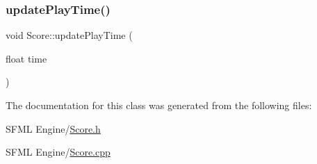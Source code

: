 \mbox{\label{class_score_a767d18294e41930ccece6d48c2398537}} 
\subsubsection{\texorpdfstring{update\+Play\+Time()}{updatePlayTime()}}
{\footnotesize\ttfamily void Score\+::update\+Play\+Time (\begin{DoxyParamCaption}\item[{float}]{time }\end{DoxyParamCaption})}



The documentation for this class was generated from the following files\+:\begin{DoxyCompactItemize}
\item 
S\+F\+M\+L Engine/\hyperlink{_score_8h}{Score.\+h}\item 
S\+F\+M\+L Engine/\hyperlink{_score_8cpp}{Score.\+cpp}\end{DoxyCompactItemize}

